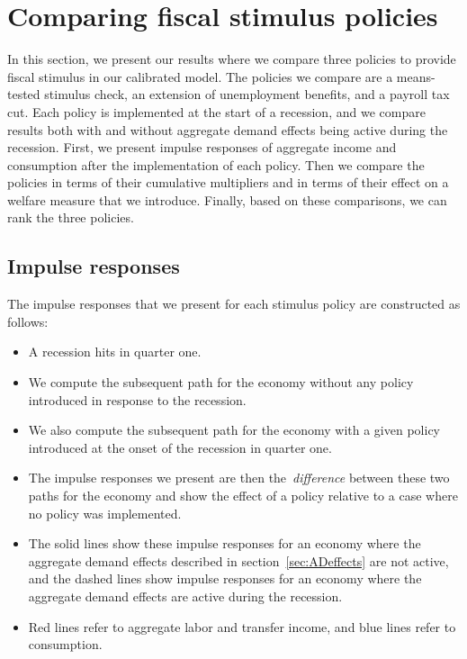 \documentclass[qe]{econsocart}
\begin{document}
\vspace{1em}  %

\FloatBarrier
\section{Comparing fiscal stimulus policies}
\label{sec:comparing} 

In this section, we present our results where we compare three policies to provide fiscal stimulus in our calibrated model. The policies we compare are a means-tested stimulus check, an extension of unemployment benefits, and a payroll tax cut. Each policy is implemented at the start of a recession, and we compare results both with and without aggregate demand effects being active during the recession. First, we present impulse responses of aggregate income and consumption after the implementation of each policy. Then we compare the policies in terms of their cumulative multipliers and in terms of their effect on a welfare measure that we introduce. Finally, based on these comparisons, we can rank the three policies.

\subsection{Impulse responses}
\label{sec:IRFs} 

The impulse responses that we present for each stimulus policy are constructed as follows:
\begin{itemize}
  \setlength{\itemsep}{0.0ex}
  \item
        A recession hits in quarter one.
  \item
        We compute the subsequent path for the economy without any policy introduced in response to the recession.
  \item
        We also compute the subsequent path for the economy with a given policy introduced at the onset of the recession in quarter one.
  \item
        The impulse responses we present are then the~\textit{difference} between these two paths for the economy and show the effect of a policy relative to a case where no policy was implemented.
  \item
        The solid lines show these impulse responses for an economy where the aggregate demand effects described in section~\ref{sec:ADeffects} are not active, and the dashed lines show impulse responses for an economy where the aggregate demand effects are active during the recession.
  \item
        Red lines refer to aggregate labor and transfer income, and blue lines refer to consumption.
\end{itemize}
\end{document}
